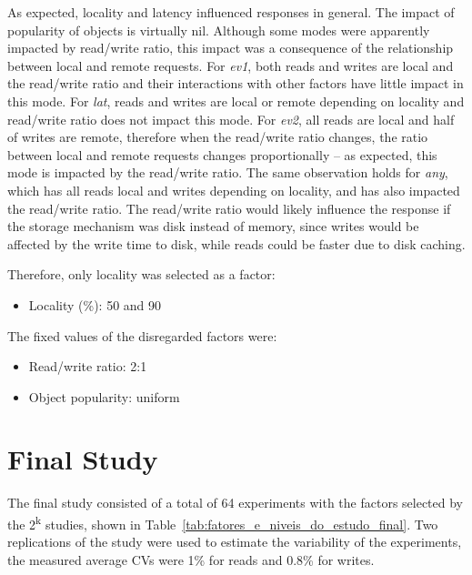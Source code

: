 \documentclass[doublespacing]{bmcart}
\begin{document}
As expected, locality and latency influenced responses in general. The impact of
popularity of objects is virtually nil. Although some modes were apparently
impacted by read/write ratio, this impact was a consequence of the relationship
between local and remote requests. For \textit{ev1}, both reads and writes are
local and the read/write ratio and their interactions with other factors have little impact in this mode. For \textit{lat}, reads and writes are local or remote
depending on locality and read/write ratio does not impact this mode. For
\textit{ev2}, all reads are local and half of writes are remote, therefore when
the read/write ratio changes, the ratio between local and remote requests
changes proportionally -- as expected, this mode is impacted by the read/write ratio.
The same observation holds for \textit{any}, which has all reads local and
writes depending on locality, and has also impacted the read/write ratio. The
read/write ratio would likely influence the response if the storage mechanism
was disk instead of memory, since writes would be affected by the write
time to disk, while reads could be faster due to disk caching.

Therefore, only locality was selected as a factor:

\begin{itemize}

\item Locality (\%): 50 and 90

\end{itemize}

The fixed values of the disregarded factors were:

\begin{itemize}

\item Read/write ratio: 2:1

\item Object popularity: uniform

\end{itemize}

\section{Final Study}

The final study consisted of a total of 64 experiments with the factors selected
by the 2\textsuperscript{k} studies, shown in
Table~\ref{tab:fatores_e_niveis_do_estudo_final}. Two replications of the study were used to
estimate the variability of the experiments, the measured average CVs
were 1\% for reads and 0.8\% for writes.
\end{document}

